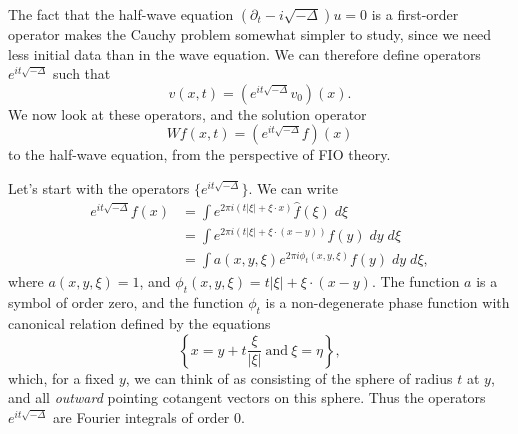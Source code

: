 \documentclass{article}
\theoremstyle{plain}
\theoremstyle{remark}
\theoremstyle{definition}
\begin{document}
The fact that the half-wave equation $(\partial_t - i \sqrt{-\Delta}) u = 0$ is a first-order operator makes the Cauchy problem somewhat simpler to study, since we need less initial data than in the wave equation. We can therefore define operators $e^{it \sqrt{-\Delta}}$ such that
%
\[ v(x,t) = (e^{i t \sqrt{-\Delta}} v_0)(x). \]
%
We now look at these operators, and the solution operator
%
\[ Wf(x,t) = (e^{i t \sqrt{-\Delta}} f)(x) \]
%
to the half-wave equation, from the perspective of FIO theory.

\begin{comment}

Fourier transform of e^{-|x|} is

	c_d (1 + |xi|^2)^{- (d+1) / 2}

Fourier transform of e^{- lambda |x|} for lambda > 0 is

	int e^{- lambda |x|} e^{-i xi * x} dx
	= c_d lambda^{-d} (1 + |xi|^2 / lambda^2)^{-(d+1)/2}

Can we now apply analytic continuation to conclude that
the Fourier transform of e^{-it |x|} is equal to

	c_d (it)^{-d} ( 1 + |xi|^2 / (it + 0)^2 )^{-(d+1)/2}

where we take the branch of the square root that is the analytic extension
away of the normal square root away, defined away from the imaginary axis.

Then for |xi| > t this quantity is equal to

	c_d i t^{-d} ( |xi|^2 / t^2 - 1 )^{-(d+1)/2}

e^{-i pi / 2}

sqrt( a e^{it} ) = sqrt(a) sqrt(e^{it/2})

\end{comment}

Let's start with the operators $\{ e^{it \sqrt{-\Delta}} \}$. We can write
%
\begin{align*}
	e^{i t \sqrt{-\Delta}} f(x) &= \int e^{2 \pi i (t |\xi| + \xi \cdot x)} \widehat{f}(\xi)\; d\xi\\
	&= \int e^{2 \pi i (t |\xi| + \xi \cdot (x - y))} f(y)\; dy\; d\xi\\
	&= \int a(x,y,\xi) e^{2 \pi i \phi_t(x,y,\xi)} f(y)\; dy\; d\xi,
\end{align*}
%
where $a(x,y,\xi) = 1$, and $\phi_t(x,y,\xi) = t |\xi| + \xi \cdot (x - y)$. The function $a$ is a symbol of order zero, and the function $\phi_t$ is a non-degenerate phase function with canonical relation defined by the equations
%
\[ \left\{ x = y + t \frac{\xi}{|\xi|}\ \text{and}\ \xi = \eta \right\}, \]
%
which, for a fixed $y$, we can think of as consisting of the sphere of radius $t$ at $y$, and all \emph{outward} pointing cotangent vectors on this sphere. Thus the operators $e^{it \sqrt{-\Delta}}$ are Fourier integrals of order $0$.
\end{document}
